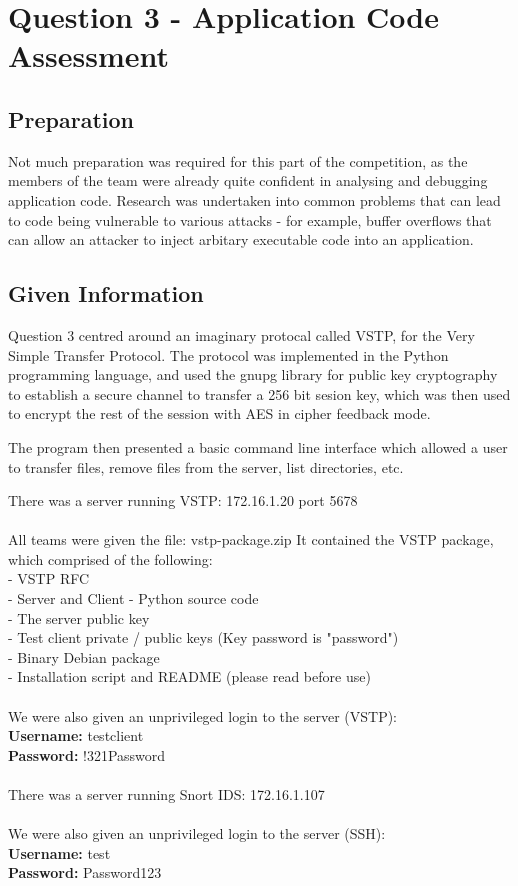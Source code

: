 \chapter{Question 3 - Application Code Assessment}

\section{Preparation}
Not much preparation was required for this part of the competition, as the
members of the team were already quite confident in analysing and debugging
application code. Research was undertaken into common problems that can lead to
code being vulnerable to various attacks - for example, buffer overflows that
can allow an attacker to inject arbitary executable code into an application.

\section{Given Information}
Question 3 centred around an imaginary protocal called VSTP, for the Very 
Simple Transfer Protocol. The protocol was implemented in the Python 
programming language, and used the gnupg library for public key cryptography
to establish a secure channel to transfer a 256 bit sesion key, which was then
used to encrypt the rest of the session with AES in cipher feedback mode.

The program then presented a basic command line interface which allowed a user
to transfer files, remove files from the server, list directories, etc.

There was a server running VSTP: 172.16.1.20 port 5678
\\\\
All teams were given the file: vstp-package.zip
It contained the VSTP package, which comprised of the following:
\\- VSTP RFC
\\- Server and Client - Python source code
\\- The server public key
\\- Test client private / public keys (Key password is "password")
\\- Binary Debian package
\\- Installation script and README (please read before use)
\\\\
We were also given an unprivileged login to the server (VSTP):\\
\textbf{Username:} testclient
\\
\textbf{Password:} !321Password
\\\\
There was a server running Snort IDS: 172.16.1.107
\\\\
We were also given an unprivileged login to the server (SSH):\\
\textbf{Username:} test
\\
\textbf{Password:} Password123

